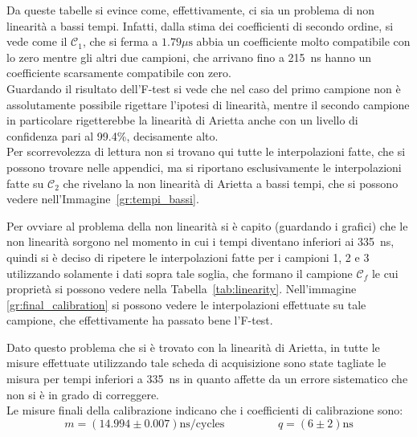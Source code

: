 Da queste tabelle si evince come, effettivamente, ci sia un problema di non linearità a bassi tempi. Infatti, dalla stima dei coefficienti di secondo ordine, si vede come il $\mathcal{C}_1$, che si ferma a $1.79 \mu\text{s}$ abbia un coefficiente molto compatibile con lo zero mentre gli altri due campioni, che arrivano fino a 215~ns hanno un coefficiente scarsamente compatibile con zero.\\

Guardando il risultato dell'F-test si vede che nel caso del primo campione non è assolutamente possibile rigettare l'ipotesi di linearità, mentre il secondo campione in particolare rigetterebbe la linearità di Arietta anche con un livello di confidenza pari al 99.4\%, decisamente alto.\\


Per scorrevolezza di lettura non si trovano qui tutte le interpolazioni fatte, che si possono trovare nelle appendici, ma si riportano esclusivamente le interpolazioni fatte su $\mathcal{C}_2$  che rivelano la non linearità di Arietta a bassi tempi, che si possono vedere nell'Immagine~\ref{gr:tempi_bassi}.\\

Per ovviare al problema della non linearità si è capito (guardando i grafici) che le non linearità sorgono nel momento in cui i tempi diventano inferiori ai 335~ns, quindi si è deciso di ripetere le interpolazioni fatte per i campioni 1, 2 e 3 utilizzando solamente i dati sopra tale soglia, che formano il campione $\mathcal{C}_f$ le cui proprietà si possono vedere nella Tabella~\ref{tab:linearity}. Nell'immagine \ref{gr:final_calibration} si possono vedere le interpolazioni effettuate su tale campione, che effettivamente ha passato bene l'F-test.\\

Dato questo problema che si è trovato con la linearità di Arietta, in tutte le misure effettuate utilizzando tale scheda di acquisizione sono state tagliate le misura per tempi inferiori a 335~ns in quanto affette da un errore sistematico che non si è in grado di correggere.\\

Le misure finali della calibrazione indicano che i coefficienti  di calibrazione sono:
\begin{equation}
  m = (14.994 \pm 0.007) \text{ns/cycles} \hspace{2cm} q = (6 \pm 2) \text{ns}
\end{equation}


